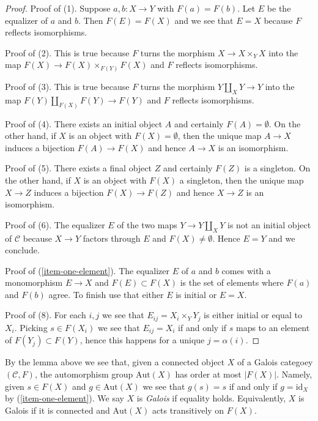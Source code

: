 \begin{proof}
Proof of (1). Suppose $a, b : X \to Y$ with $F(a) = F(b)$.
Let $E$ be the equalizer of $a$ and $b$. Then $F(E) = F(X)$
and we see that $E = X$ because $F$ reflects isomorphisms.

\medskip\noindent
Proof of (2). This is true because $F$ turns the morphism $X \to X \times_Y X$
into the map $F(X) \to F(X) \times_{F(Y)} F(X)$ and $F$ reflects isomorphisms.

\medskip\noindent
Proof of (3). This is true because $F$ turns the morphism $Y \amalg_X Y \to Y$
into the map $F(Y) \amalg_{F(X)} F(Y) \to F(Y)$ and $F$ reflects isomorphisms.

\medskip\noindent
Proof of (4). There exists an initial object $A$ and certainly
$F(A) = \emptyset$. On the other hand, if $X$ is an object with
$F(X) = \emptyset$, then the unique map $A \to X$ induces a bijection
$F(A) \to F(X)$ and hence $A \to X$ is an isomorphism.

\medskip\noindent
Proof of (5). There exists a final object $Z$ and certainly
$F(Z)$ is a singleton. On the other hand, if $X$ is an object with
$F(X)$ a singleton, then the unique map $X \to Z$ induces a bijection
$F(X) \to F(Z)$ and hence $X \to Z$ is an isomorphism.

\medskip\noindent
Proof of (6). The equalizer $E$ of the two maps $Y \to Y \amalg_X Y$ is not
an initial object of $\mathcal{C}$ because $X \to Y$ factors through $E$
and $F(X) \not = \emptyset$. Hence $E = Y$ and we conclude.

\medskip\noindent
Proof of (\ref{item-one-element}).
The equalizer $E$ of $a$ and $b$ comes with a monomorphism
$E \to X$ and $F(E) \subset F(X)$ is the set of elements where
$F(a)$ and $F(b)$ agree. To finish use that either $E$ is initial
or $E = X$.

\medskip\noindent
Proof of (8). For each $i, j$ we see that $E_{ij} = X_i \times_Y Y_j$
is either initial or equal to $X_i$. Picking $s \in F(X_i)$
we see that $E_{ij} = X_i$ if and only if $s$ maps to an element
of $F(Y_j) \subset F(Y)$, hence this happens for a unique $j = \alpha(i)$.
\end{proof}

\noindent
By the lemma above we see that, given a connected object $X$ of a
Galois categoey $(\mathcal{C}, F)$, the automorphism group
$\text{Aut}(X)$ has order at most $|F(X)|$. Namely, given $s \in F(X)$
and $g \in \text{Aut}(X)$ we see that $g(s) = s$ if and only
if $g = \text{id}_X$ by (\ref{item-one-element}).
We say $X$ is {\it Galois} if equality holds.
Equivalently, $X$ is Galois if it is connected and
$\text{Aut}(X)$ acts transitively on $F(X)$.

